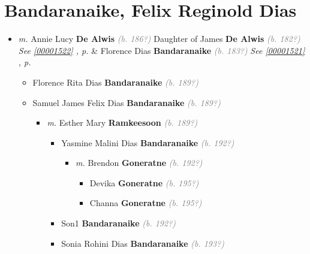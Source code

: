 \documentclass[10pt, openany]{book}
\begin{document}
\chapter{Bandaranaike, Felix Reginold Dias}
\label{00001362}
\textcolor{slmaroon}{\textit{}}
\begin{itemize}
\item{\textit{m.} Annie Lucy  \textbf{De Alwis} \textcolor{gray}{\textit{(b. 186?)}} Daughter of  James \textbf{De Alwis} \textcolor{gray}{\textit{(b. 182?)}} \textcolor{slteal}{\textit{See  \autoref{00001522} \textit{, p. \pageref{00001522} }}}  \&  Florence Dias \textbf{Bandaranaike} \textcolor{gray}{\textit{(b. 183?)}} \textcolor{slteal}{\textit{See  \autoref{00001521} \textit{, p. \pageref{00001521} }}}   \label{couple:00001362:00001363} \begin{itemize}
\item{Florence Rita Dias \textbf{Bandaranaike} \textcolor{gray}{\textit{(b. 189?)}}
   }
\item{Samuel James Felix Dias \textbf{Bandaranaike} \textcolor{gray}{\textit{(b. 189?)}}
\begin{itemize}
\item{\textit{m.} Esther Mary \textbf{Ramkeesoon} \textcolor{gray}{\textit{(b. 189?)}}   \label{couple:00001401:00001402} \begin{itemize}
\item{Yasmine Malini Dias \textbf{Bandaranaike} \textcolor{gray}{\textit{(b. 192?)}}
\begin{itemize}
\item{\textit{m.} Brendon \textbf{Goneratne} \textcolor{gray}{\textit{(b. 192?)}}   \label{couple:00001418:00001419} \begin{itemize}
\item{Devika \textbf{Goneratne} \textcolor{gray}{\textit{(b. 195?)}}
 }
\item{Channa \textbf{Goneratne} \textcolor{gray}{\textit{(b. 195?)}}
 }
\end{itemize}}
\end{itemize}
   }
\item{Son1 \textbf{Bandaranaike} \textcolor{gray}{\textit{(b. 192?)}}
 }
\item{Sonia Rohini Dias \textbf{Bandaranaike} \textcolor{gray}{\textit{(b. 193?)}}
\begin{itemize}

\end{itemize}}
\end{itemize}}
\end{itemize}}
\end{itemize}}
\end{itemize}
\end{document}
